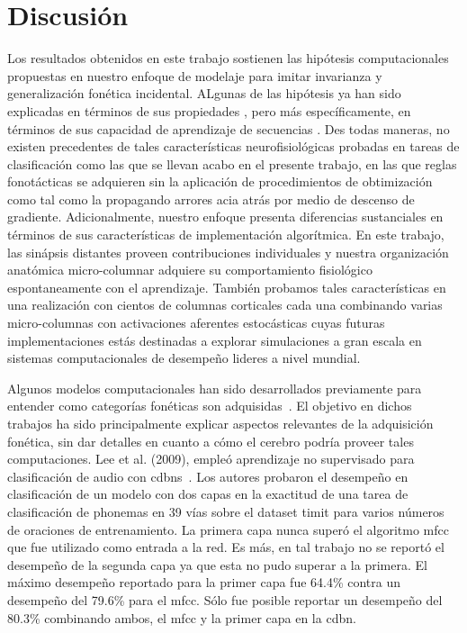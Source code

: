 \section{Discusión}

Los resultados obtenidos en este trabajo sostienen las hipótesis computacionales propuestas en nuestro enfoque de modelaje para imitar invarianza y generalización fonética incidental.
ALgunas de las hipótesis ya han sido explicadas en términos de sus propiedades  \cite{hawkins_2016}, pero más específicamente, en términos de sus capacidad de aprendizaje de secuencias \cite{cui_2016}.
Des todas maneras, no existen precedentes de tales características neurofisiológicas probadas en tareas de clasificación como las que se llevan acabo en el presente trabajo, en las que reglas fonotácticas se adquieren sin la aplicación de procedimientos de obtimización como tal como la propagando arrores acia atrás por medio de descenso de gradiente. Adicionalmente, nuestro enfoque presenta diferencias sustanciales en términos de sus características de implementación algorítmica. En este trabajo, las sinápsis distantes proveen contribuciones individuales y nuestra organización anatómica micro-columnar adquiere su comportamiento fisiológico espontaneamente con el aprendizaje. También probamos tales características en una realización con cientos de columnas corticales cada una combinando varias micro-columnas con activaciones aferentes estocásticas cuyas futuras implementaciones estás destinadas a explorar simulaciones a gran escala en sistemas computacionales de desempeño lideres a nivel mundial.

Algunos modelos computacionales han sido desarrollados previamente para entender como categorías fonéticas son adquisidas~\cite{rasanen_2012}. El objetivo en dichos trabajos ha sido principalmente explicar aspectos relevantes de la adquisición fonética, sin dar detalles en cuanto a cómo el cerebro podría proveer tales computaciones.
Lee et al. (2009), empleó aprendizaje no supervisado para clasificación de audio con \glspl{cdbn}~\cite{Lee:2009:UFL:2984093.2984217}. 
Los autores probaron el desempeño en clasificación de un modelo con dos capas en la exactitud de una tarea de clasificación de phonemas en 39 vías sobre el dataset \gls{timit} para varios números de oraciones de entrenamiento. 
La primera capa nunca superó el algoritmo \gls{mfcc} que fue utilizado como entrada a la red.
Es más, en tal trabajo no se reportó el desempeño de la segunda capa ya que esta no pudo superar a la primera.
El máximo desempeño reportado para la primer capa fue 64.4\% contra un desempeño del 79.6\% para el \gls{mfcc}.
Sólo fue posible reportar un desempeño del 80.3\% combinando ambos, el \gls{mfcc} y la primer capa en la \gls{cdbn}.

